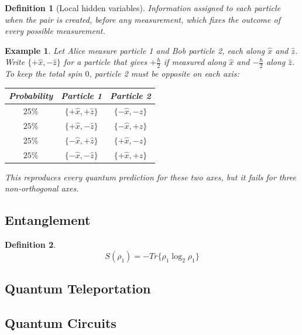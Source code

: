 \documentclass{article}
\newtheorem{definition}{Definition}
\newtheorem*{example}{Example}
\begin{document}
\begin{definition}[Local hidden variables]
    Information assigned to each particle when the pair is created, before any measurement, which fixes the outcome of every possible measurement.
\end{definition}
\begin{example}
    Let Alice measure particle 1 and Bob particle 2, each along $\hat{x}$ and $\hat{z}$. Write $\{+\hat{x},-\hat{z}\}$ for a particle that gives $+\frac{\hbar}{2}$ if measured along $\hat{x}$ and $-\frac{\hbar}{2}$ along $\hat{z}$. To keep the total spin $0$, particle 2 must be opposite on each axis:
    \begin{center}
        \begin{tabular}{ccc}
            Probability & Particle 1 & Particle 2 \\
            \hline
            $25\%$ & $\{+\hat{x},+\hat{z}\}$ & $\{-\hat{x},-\hat{z}\}$ \\
            $25\%$ & $\{+\hat{x},-\hat{z}\}$ & $\{-\hat{x},+\hat{z}\}$ \\
            $25\%$ & $\{-\hat{x},+\hat{z}\}$ & $\{+\hat{x},-\hat{z}\}$ \\
            $25\%$ & $\{-\hat{x},-\hat{z}\}$ & $\{+\hat{x},+\hat{z}\}$
        \end{tabular}
    \end{center}
    This reproduces every quantum prediction for these two axes, but it fails for three non-orthogonal axes.
\end{example}

\subsection{Entanglement}

\begin{definition}
    \begin{equation}
        \label{}
        S(\rho_1) = - Tr\{\rho_1\log_2\rho_1\}
    \end{equation}
\end{definition}
\subsection{Quantum Teleportation}

\subsection{Quantum Circuits}
\end{document}
